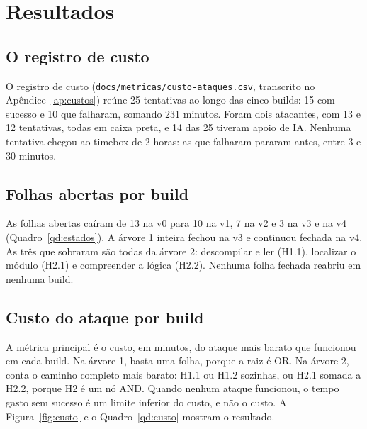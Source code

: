 \section{Resultados}
\label{sec:resultados}

\subsection{O registro de custo}

O registro de custo (\texttt{docs/metricas/custo-ataques.csv}, transcrito no Apêndice~\ref{ap:custos}) reúne 25 tentativas ao longo das cinco builds: 15 com sucesso e 10 que falharam, somando 231 minutos. Foram dois atacantes, com 13 e 12 tentativas, todas em caixa preta, e 14 das 25 tiveram apoio de IA. Nenhuma tentativa chegou ao timebox de 2 horas: as que falharam pararam antes, entre 3 e 30 minutos.

\subsection{Folhas abertas por build}

As folhas abertas caíram de 13 na v0 para 10 na v1, 7 na v2 e 3 na v3 e na v4 (Quadro~\ref{qd:estados}). A árvore 1 inteira fechou na v3 e continuou fechada na v4. As três que sobraram são todas da árvore 2: descompilar e ler (H1.1), localizar o módulo (H2.1) e compreender a lógica (H2.2). Nenhuma folha fechada reabriu em nenhuma build.

\subsection{Custo do ataque por build}

A métrica principal é o custo, em minutos, do ataque mais barato que funcionou em cada build. Na árvore 1, basta uma folha, porque a raiz é OR. Na árvore 2, conta o caminho completo mais barato: H1.1 ou H1.2 sozinhas, ou H2.1 somada a H2.2, porque H2 é um nó AND. Quando nenhum ataque funcionou, o tempo gasto sem sucesso é um limite inferior do custo, e não o custo. A Figura~\ref{fig:custo} e o Quadro~\ref{qd:custo} mostram o resultado.


